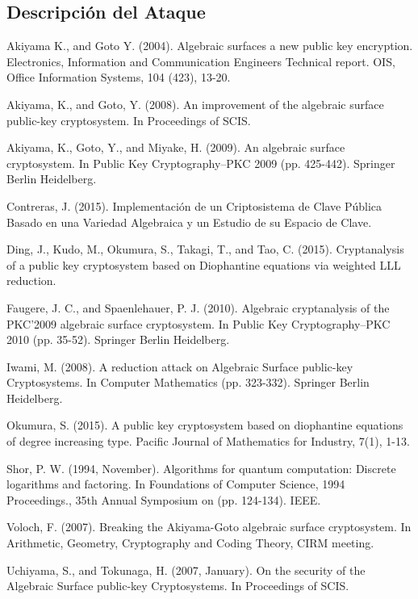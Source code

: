 \documentclass[11pt]{article}
\numberwithin{equation}{section} %
\numberwithin{figure}{section} %
\numberwithin{table}{section} %
\begin{document}
		\subsection{Descripci\'on del Ataque}
		\label{54AtaqDiof}


\begin{thebibliography}{99}

 Akiyama K., and Goto Y. (2004). Algebraic surfaces a new public key encryption. Electronics, Information and Communication Engineers Technical report. OIS, Office Information Systems, 104 (423), 13-20.

 Akiyama, K., and Goto, Y. (2008). An improvement of the algebraic surface public-key cryptosystem. In Proceedings of SCIS.

 Akiyama, K., Goto, Y., and Miyake, H. (2009). An algebraic surface cryptosystem. In Public Key Cryptography–PKC 2009 (pp. 425-442). Springer Berlin Heidelberg.

 Contreras, J. (2015). Implementaci\'on de un Criptosistema de Clave P\'ublica Basado en una Variedad Algebraica y un Estudio de su Espacio de Clave.%

Ding, J., Kudo, M., Okumura, S., Takagi, T., and Tao, C. (2015). Cryptanalysis of a public key cryptosystem based on Diophantine equations via weighted LLL reduction.

 Faugere, J. C., and Spaenlehauer, P. J. (2010). Algebraic cryptanalysis of the PKC’2009 algebraic surface cryptosystem. In Public Key Cryptography–PKC 2010 (pp. 35-52). Springer Berlin Heidelberg.

 Iwami, M. (2008). A reduction attack on Algebraic Surface public-key Cryptosystems. In Computer Mathematics (pp. 323-332). Springer Berlin Heidelberg.

Okumura, S. (2015). A public key cryptosystem based on diophantine equations of degree increasing type. Pacific Journal of Mathematics for Industry, 7(1), 1-13.

 Shor, P. W. (1994, November). Algorithms for quantum computation: Discrete logarithms and factoring. In Foundations of Computer Science, 1994 Proceedings., 35th Annual Symposium on (pp. 124-134). IEEE.

 Voloch, F. (2007). Breaking the Akiyama-Goto algebraic surface cryptosystem. In Arithmetic, Geometry, Cryptography and Coding Theory, CIRM meeting.

 Uchiyama, S., and Tokunaga, H. (2007, January). On the security of the Algebraic Surface public-key Cryptosystems. In Proceedings of SCIS.



\end{thebibliography}
\end{document}
